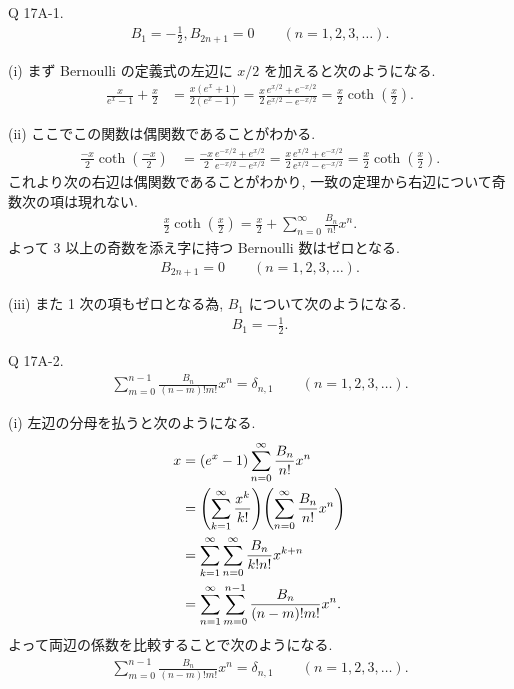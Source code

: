 \documentclass[uplatex,dvipdfmx,a4paper,11pt]{jlreq}
\theoremstyle{definition}
\begin{document}
\begin{itembox}[l]{Q 17A-1.}
  \begin{align}
    B_1 = -\frac{1}{2}, B_{2n+1} = 0 \qquad (n = 1,2,3,\ldots).
  \end{align}
\end{itembox}

(i) まず Bernoulli の定義式の左辺に $x/2$ を加えると次のようになる.
\begin{align}
  \frac{x}{e^x - 1} + \frac{x}{2} & = \frac{x(e^x + 1)}{2(e^x - 1)} = \frac{x}{2}\frac{e^{x/2} + e^{-x/2}}{e^{x/2} - e^{-x/2}} = \frac{x}{2}\coth(\frac{x}{2}).
\end{align}

(ii) ここでこの関数は偶関数であることがわかる.
\begin{align}
  \frac{-x}{2}\coth(\frac{-x}{2}) & = \frac{-x}{2}\frac{e^{-x/2} + e^{x/2}}{e^{-x/2} - e^{x/2}} = \frac{x}{2}\frac{e^{x/2} + e^{-x/2}}{e^{x/2} - e^{-x/2}} = \frac{x}{2}\coth(\frac{x}{2}).
\end{align}
これより次の右辺は偶関数であることがわかり, 一致の定理から右辺について奇数次の項は現れない.
\begin{align}
  \frac{x}{2}\coth(\frac{x}{2}) = \frac{x}{2} + \sum_{n=0}^{\infty}\frac{B_n}{n!}x^n.
\end{align}
よって 3 以上の奇数を添え字に持つ Bernoulli 数はゼロとなる.
\begin{align}
  B_{2n+1} = 0 \qquad (n = 1,2,3,\ldots).
\end{align}

(iii) また 1 次の項もゼロとなる為, $B_1$ について次のようになる.
\begin{align}
  B_1 = -\frac{1}{2}.
\end{align}

\begin{itembox}[l]{Q 17A-2.}
  \begin{align}
    \sum_{m=0}^{n-1}\frac{B_n}{(n - m)!m!}x^n = \delta_{n,1} \qquad (n = 1,2,3,\ldots).
  \end{align}
\end{itembox}

(i)
左辺の分母を払うと次のようになる.
\begin{align}
  x & = (e^x - 1)\sum_{n=0}^{\infty}\frac{B_n}{n!}x^n                                     \\
    & = \qty(\sum_{k=1}^{\infty}\frac{x^k}{k!})\qty(\sum_{n=0}^{\infty}\frac{B_n}{n!}x^n) \\
    & = \sum_{k=1}^{\infty}\sum_{n=0}^{\infty}\frac{B_n}{k!n!}x^{k+n}                     \\
    & = \sum_{n=1}^{\infty}\sum_{m=0}^{n-1}\frac{B_n}{(n - m)!m!}x^n.
\end{align}
よって両辺の係数を比較することで次のようになる.
\begin{align}
  \sum_{m=0}^{n-1}\frac{B_n}{(n - m)!m!}x^n = \delta_{n,1} \qquad (n = 1,2,3,\ldots).
\end{align}
\end{document}
